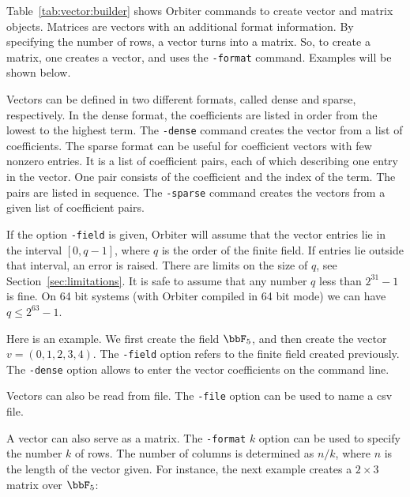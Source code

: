 Table~\ref{tab:vector:builder} shows Orbiter commands to create vector and matrix objects.
Matrices are vectors with an additional format information. By specifying the number of rows, 
a vector turns into a matrix. 
So, to create a matrix, one creates a vector, and uses the \verb'-format' command.
Examples will be shown below. 






\bigskip


Vectors can be defined in two different formats, 
called dense and sparse, respectively.
In the dense format, the coefficients 
are listed in order from the lowest to the highest term.
The \verb'-dense' command creates the vector from a list of coefficients.
The sparse format can be useful for coefficient vectors with few nonzero entries.
It is a list of coefficient pairs, 
each of which describing one entry in the vector.
One pair consists of the coefficient and the index of the term. 
The pairs are listed in sequence.
The \verb'-sparse' command creates the vectors 
from a given list of coefficient pairs. 


\bigskip

If the option \verb'-field' is given, 
Orbiter will assume that the vector entries lie in the 
interval $[0,q-1]$, where $q$ is the order of the finite field. 
If entries lie outside that interval, 
an error is raised.
There are limits on the size of $q$, see Section~\ref{sec:limitations}.
It is safe to assume that any number $q$ 
less than $2^{31}-1$ is fine. 
On 64 bit systems (with Orbiter compiled in 64 bit mode) 
we can have $q \le 2^{63}-1.$

\bigskip


Here is an example. 
We first create the field $\bbF_5$, 
and then create the vector $v=(0,1,2,3,4)$.
The \verb'-field' option refers to 
the finite field created previously.
The \verb'-dense' option allows to enter 
the vector coefficients on the command line. 



\bigskip


Vectors can also be read from file. 
The \verb'-file' option can be used to name a csv file. 

\bigskip


A vector can also serve as a matrix. 
The \verb'-format' $k$ option can be used to specify the number $k$ of rows. 
The number of columns is determined as $n/k$, 
where $n$ is the length of the vector given.
For instance, the next example 
creates a $2 \times 3$ matrix over $\bbF_5$:

